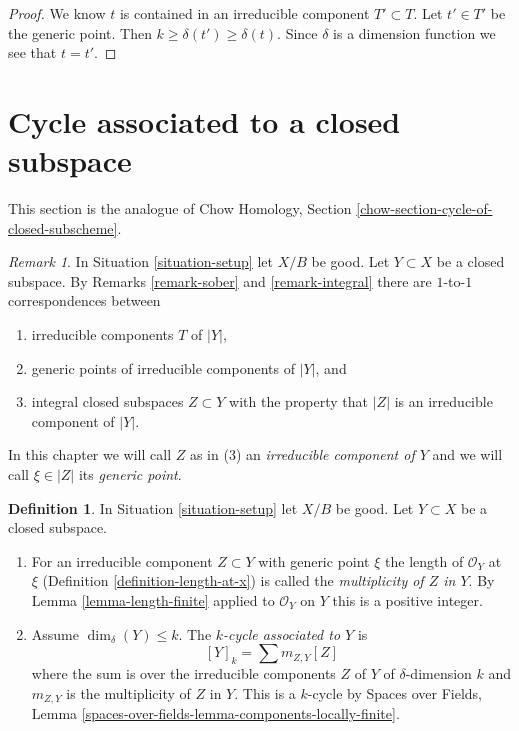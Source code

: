 \documentclass{stacks-project}
\theoremstyle{plain}
\theoremstyle{definition}
\newtheorem{definition}[subsection]{Definition}
\theoremstyle{remark}
\newtheorem{remark}[subsection]{Remark}
\numberwithin{equation}{subsection}
\begin{document}
\begin{proof}
We know $t$ is contained in an irreducible component $T' \subset T$.
Let $t' \in T'$ be the generic point. Then
$k \geq \delta(t') \geq \delta(t)$. Since $\delta$ is a dimension
function we see that $t = t'$.
\end{proof}



\section{Cycle associated to a closed subspace}
\label{section-cycle-of-closed-subscheme}

\noindent
This section is the analogue of
Chow Homology, Section \ref{chow-section-cycle-of-closed-subscheme}.

\begin{remark}
\label{remark-irreducible-component}
In Situation \ref{situation-setup} let $X/B$ be good.
Let $Y \subset X$ be a closed subspace. By
Remarks \ref{remark-sober} and \ref{remark-integral}
there are $1$-to-$1$ correspondences between
\begin{enumerate}
\item irreducible components $T$ of $|Y|$,
\item generic points of irreducible components of $|Y|$, and
\item integral closed subspaces $Z \subset Y$ with the property that
$|Z|$ is an irreducible component of $|Y|$.
\end{enumerate}
In this chapter we will call $Z$ as in (3) an
{\it irreducible component of $Y$}
and we will call $\xi \in |Z|$ its {\it generic point}.
\end{remark}

\begin{definition}
\label{definition-cycle-associated-to-closed-subscheme}
In Situation \ref{situation-setup} let $X/B$ be good.
Let $Y \subset X$ be a closed subspace.
\begin{enumerate}
\item For an irreducible component $Z \subset Y$ with generic point $\xi$
the length of $\mathcal{O}_Y$ at $\xi$
(Definition \ref{definition-length-at-x}) is called the
{\it multiplicity of $Z$ in $Y$}.
By Lemma \ref{lemma-length-finite} applied to $\mathcal{O}_Y$
on $Y$ this is a positive integer.
\item Assume $\dim_\delta(Y) \leq k$.
The {\it $k$-cycle associated to $Y$} is
$$
[Y]_k = \sum m_{Z, Y}[Z]
$$
where the sum is over the irreducible components $Z$ of $Y$
of $\delta$-dimension $k$ and $m_{Z, Y}$ is the multiplicity
of $Z$ in $Y$.
This is a $k$-cycle by Spaces over Fields, Lemma
\ref{spaces-over-fields-lemma-components-locally-finite}.
\end{enumerate}
\end{definition}
\end{document}
